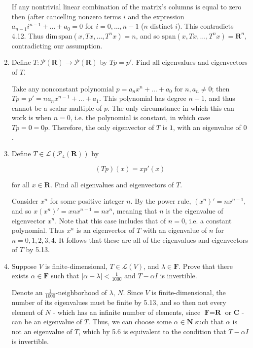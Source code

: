 \documentclass{book}
\begin{document}
\begin{enumerate}
If any nontrivial linear combination of the matrix's columns is equal to zero then (after cancelling nonzero terms \(i\) and the expression \(a_{n-1}i^{n-1}+\dots+a_0=0\) for \(i=0,\dots,n-1\) (\(n\) distinct \(i\)).  This contradicts 4.12.  Thus \(\text{dim} \, \text{span}(x, Tx, \dots, T^nx)=n\), and so \(\text{span}(x, Tx, \dots, T^nx)=\textbf{R}^n\), contradicting our assumption.

\item Define \(T: \mathcal{P}(\textbf{R}) \rightarrow \mathcal{P}(\textbf{R})\) by \(Tp=p'\).  Find all eigenvalues and eigenvectors of \(T\).

Take any nonconstant polynomial \(p=a_nx^n+\dots+a_0\) for \(n, a_n \neq 0\); then \(Tp=p'=na_nx^{n-1}+\dots+a_1\).  This polynomial has degree \(n-1\), and thus cannot be a scalar multiple of \(p\).  The only circumstance in which this can work is when \(n=0\), i.e. the polynomial is constant, in which case \(Tp=0=0p\).  Therefore, the only eigenvector of \(T\) is \(1\), with an eigenvalue of \(0\).

\item Define \(T \in \mathcal{L}(\mathcal{P}_4(\textbf{R}))\) by 

\begin{equation*}
    (Tp)(x)=xp'(x)
\end{equation*}

for all \(x \in \textbf{R}\).  Find all eigenvalues and eigenvectors of \(T\).

Consider \(x^n\) for some positive integer \(n\).  By the power rule, \((x^n)'=nx^{n-1}\), and so \(x(x^n)'=xnx^{n-1}=nx^n\), meaning that \(n\) is the eigenvalue of eigenvector \(x^n\).  Note that this case includes that of \(n=0\), i.e. a constant polynomial.  Thus \(x^n\) is an eigenvector of \(T\) with an eigenvalue of \(n\) for \(n=0,1,2,3,4\).  It follows that these are all of the eigenvalues and eigenvectors of \(T\) by 5.13.

\item Suppose \(V\) is finite-dimensional, \(T \in \mathcal{L}(V)\), and \(\lambda \in \textbf{F}\).  Prove that there exists \(\alpha \in \textbf{F}\) such that \(|\alpha - \lambda|<\frac{1}{1000}\) and \(T - \alpha I\) is invertible.

Denote an \(\frac{1}{1000}\)-neighborhood of \(\lambda\), \(N\).  Since \(V\) is finite-dimensional, the number of its eigenvalues must be finite by 5.13, and so then not every element of \(N\) - which has an infinite number of elements, since \(\textbf{F}=\textbf{R}\) or \(\textbf{C}\) - can be an eigenvalue of \(T\).  Thus, we can choose some \(\alpha \in \textbf{N}\) such that \(\alpha\) is not an eigenvalue of \(T\), which by 5.6 is equivalent to the condition that \(T-\alpha I\) is invertible.


\end{enumerate}
\end{document}
